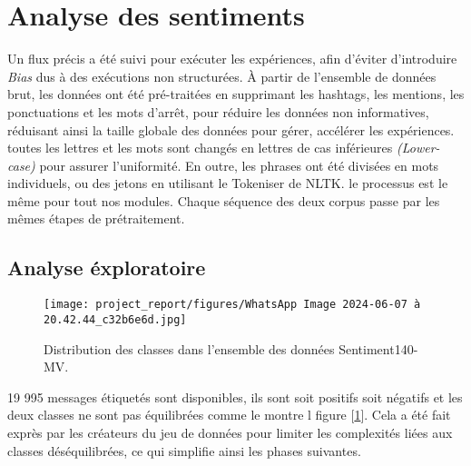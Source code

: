\section{Analyse des sentiments}
Un flux précis a été suivi pour exécuter les expériences, afin d'éviter d'introduire \textit{Bias} dus à des exécutions non structurées. À partir de l'ensemble de données brut, les données
ont été pré-traitées en supprimant les hashtags, les mentions, les ponctuations et les mots d'arrêt, pour réduire les données non informatives, réduisant ainsi la taille globale des données pour gérer, accélérer les expériences.  toutes les lettres et les mots sont changés en lettres de cas inférieures \textit{(Lower-case)} pour assurer l'uniformité. En outre, les phrases ont été divisées en mots individuels, ou des jetons en utilisant le Tokeniser de NLTK. 
le processus est le même pour tout nos modules. Chaque séquence des deux corpus passe par les mêmes étapes de prétraitement.  


\subsection{Analyse éxploratoire}


\begin{figure}[h]
    \centering
    \texttt{[image: project\_report/figures/WhatsApp Image 2024-06-07 à 20.42.44\_c32b6e6d.jpg]}
    \caption{Distribution des classes dans l'ensemble des données Sentiment140-MV.}
    \label{fig:figDes}
\end{figure}

19 995 messages étiquetés sont disponibles, ils sont soit positifs soit négatifs et les deux classes ne  sont pas équilibrées comme le montre l figure [\ref{fig:figDes}]. Cela a été fait exprès par les créateurs du jeu de données pour limiter les complexités liées aux classes déséquilibrées, ce qui simplifie ainsi les phases suivantes. 







